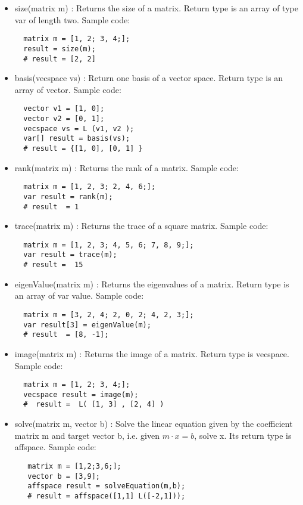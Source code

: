 \documentclass[12pt]{article} %
\begin{document}
\begin{itemize}
\item size(matrix m)
: Returns the size of a matrix. Return type is an array of type var of length two. Sample code:
\begin{lstlisting}
  matrix m = [1, 2; 3, 4;];
  result = size(m);
  # result = [2, 2]
\end{lstlisting}

\item basis(vecspace vs)
: Return one basis of a vector space. Return type is an array of vector. Sample code:
\begin{lstlisting}
  vector v1 = [1, 0];
  vector v2 = [0, 1];
  vecspace vs = L (v1, v2 );
  var[] result = basis(vs);
  # result = {[1, 0], [0, 1] }
\end{lstlisting}

\item rank(matrix m)
: Returns the rank of a matrix. Sample code:
\begin{lstlisting}
  matrix m = [1, 2, 3; 2, 4, 6;];
  var result = rank(m);
  # result  = 1
\end{lstlisting}

\item trace(matrix m)
: Returns the trace of a square matrix. Sample code:
\begin{lstlisting}
  matrix m = [1, 2, 3; 4, 5, 6; 7, 8, 9;];
  var result = trace(m);
  # result =  15
\end{lstlisting}

\item eigenValue(matrix m)
: Returns the eigenvalues of a matrix. Return type is an array of var value. Sample code:
\begin{lstlisting}
  matrix m = [3, 2, 4; 2, 0, 2; 4, 2, 3;];
  var result[3] = eigenValue(m);
  # result  = [8, -1];
\end{lstlisting}

\item image(matrix m)
: Returns the image of a matrix. Return type is vecspace. Sample code:
\begin{lstlisting}
  matrix m = [1, 2; 3, 4;];
  vecspace result = image(m);
  #  result =  L( [1, 3] , [2, 4] )
\end{lstlisting}

\item solve(matrix m, vector b)
: Solve the linear equation given by the coefficient matrix m and target vector b, i.e. given $m\cdot x = b$, solve x. Its return type is affspace. Sample code:
\begin{lstlisting}
   matrix m = [1,2;3,6;]; 
   vector b = [3,9];
   affspace result = solveEquation(m,b);
   # result = affspace([1,1] L([-2,1]));
\end{lstlisting}
\end{itemize}





\end{document}
